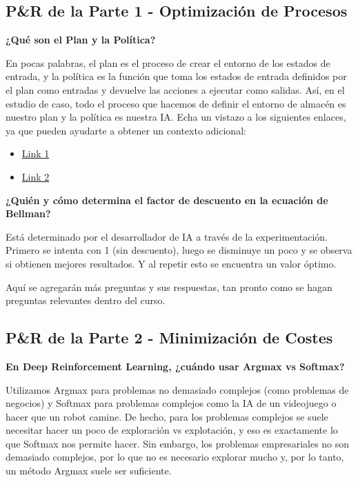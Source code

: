 \documentclass[]{book}
\providecommand{\tightlist}{%
  \setlength{\itemsep}{0pt}\setlength{\parskip}{0pt}}
\begin{document}
\hypertarget{pr-de-la-parte-1---optimizaciuxf3n-de-procesos}{%
\subsection{P\&R de la Parte 1 - Optimización de Procesos}\label{pr-de-la-parte-1---optimizaciuxf3n-de-procesos}}

\textbf{¿Qué son el Plan y la Política?}

En pocas palabras, el plan es el proceso de crear el entorno de los estados de entrada, y la política es la función que toma los estados de entrada definidos por el plan como entradas y devuelve las acciones a ejecutar como salidas. Así, en el estudio de caso, todo el proceso que hacemos de definir el entorno de almacén es nuestro plan y la política es nuestra IA. Echa un vistazo a los siguientes enlaces, ya que pueden ayudarte a obtener un contexto adicional:

\begin{itemize}
\tightlist
\item
  \href{http://www-anw.cs.umass.edu/~barto/courses/cs687/Chapter\%209.pdf}{Link 1}
\item
  \href{https://www.quora.com/In-artificial-intelligence-which-is-better-policies-or-plans-and-why}{Link 2}
\end{itemize}

\textbf{¿Quién y cómo determina el factor de descuento en la ecuación de Bellman?}

Está determinado por el desarrollador de IA a través de la experimentación. Primero se intenta con 1 (sin descuento), luego se disminuye un poco y se observa si obtienen mejores resultados. Y al repetir esto se encuentra un valor óptimo.

Aquí se agregarán más preguntas y sus respuestas, tan pronto como se hagan preguntas relevantes dentro del curso.

\hypertarget{pr-de-la-parte-2---minimizaciuxf3n-de-costes}{%
\subsection{P\&R de la Parte 2 - Minimización de Costes}\label{pr-de-la-parte-2---minimizaciuxf3n-de-costes}}

\textbf{En Deep Reinforcement Learning, ¿cuándo usar Argmax vs Softmax?}

Utilizamos Argmax para problemas no demasiado complejos (como problemas de negocios) y Softmax para problemas complejos como la IA de un videojuego o hacer que un robot camine. De hecho, para los problemas complejos se suele necesitar hacer un poco de exploración vs explotación, y eso es exactamente lo que Softmax nos permite hacer. Sin embargo, los problemas empresariales no son demasiado complejos, por lo que no es necesario explorar mucho y, por lo tanto, un método Argmax suele ser suficiente.
\end{document}
